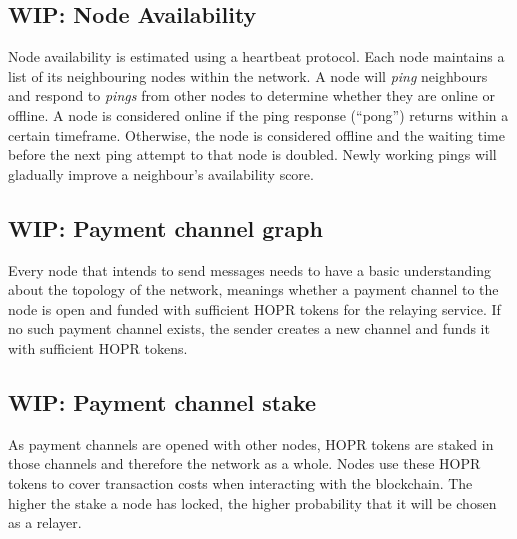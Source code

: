 \subsection{WIP: Node Availability}
\label{sec:nodeavailability}

Node availability is estimated using a heartbeat protocol. Each node maintains a
list of its neighbouring nodes within the network. A node will \textit{ping} neighbours and
respond to \textit{pings} from other nodes to determine whether they are online or offline.
A node is considered online if the ping response (``pong”) returns within a
certain timeframe. Otherwise, the node is considered offline and the waiting
time before the next ping attempt to that node is doubled. Newly working pings will gladually improve a
neighbour's availability score.
\subsection{WIP: Payment channel graph}
Every node that intends to send messages needs to have a basic understanding
about the topology of the network, meanings whether a payment channel to the node is open and
funded with sufficient HOPR tokens for the relaying service. If no such
payment channel exists, the sender creates a new channel and funds it with
sufficient HOPR tokens.
\subsection{WIP: Payment channel stake}
As payment channels are opened with other nodes, HOPR tokens are staked in those channels and therefore the network as a whole. Nodes use these HOPR
tokens to cover transaction costs when interacting with the blockchain. The higher
the stake a node has locked, the higher probability that it will be chosen as a relayer.
